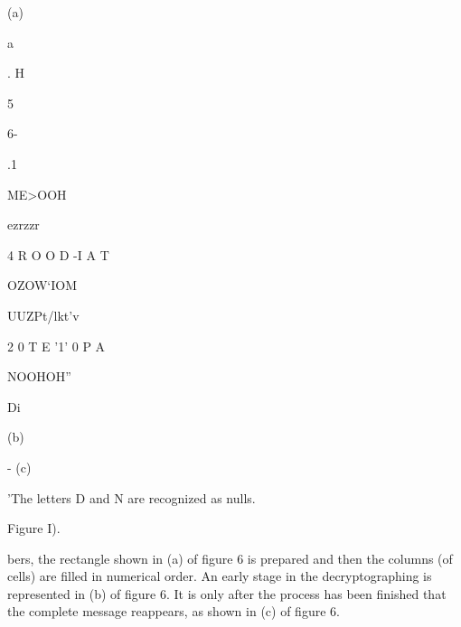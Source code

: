  

 

 

 

 

 

 

(a)

a

. H

5

6-

.1

 

 

 

 

 

 

ME>OOH

ezrzzr

 

 

4
R
O
O
D
-I
A
T

 

OZOW‘IOM

 

UUZPt/lkt'v

 

2
0
T
E
'1'
0
P
A

 

NOOHOH”

 

Di

 

 

 

(b)

- (c)

'The letters D and N are recognized as nulls.

 

Figure I).


bers, the rectangle shown in (a) of ﬁgure 6 is prepared and then the
columns (of cells) are ﬁlled in numerical order. An early stage in the
decryptographing is represented in (b) of ﬁgure 6. It is only after the
process has been ﬁnished that the complete message reappears, as shown
in (c) of ﬁgure 6.

